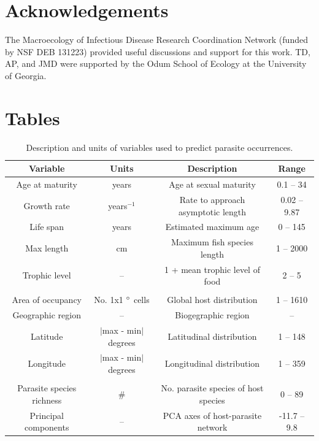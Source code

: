 \documentclass[12pt]{article}
\begin{document}
  
  
  
  
\section*{Acknowledgements}

The Macroecology of Infectious Disease Research Coordination Network (funded by NSF DEB 131223) provided useful discussions and support for this work. TD, AP, and JMD were supported by the Odum School of Ecology at the University of Georgia.






\newpage
\section*{Tables}
  \begin{table}[!h]
  \caption{Description and units of variables used to predict parasite occurrences.}
  \vspace{0.2cm}
  \begin{tabular}{cccc}
\hline
{Variable} &   {Units} &   {Description} &   {Range} \\ 
\hline
Age at maturity & years        & Age at sexual maturity  & 0.1 -- 34  \\ 
Growth rate     & years$^{-1}$ & Rate to approach asymptotic length & 0.02 -- 9.87 \\ 
Life span       & years        & Estimated maximum age & 0 -- 145  \\ 
Max length      & cm           & Maximum fish species length  & 1 -- 2000 \\ 
Trophic level   & --           & 1 + mean trophic level of food  &  2 -- 5\\ 
 & & &  \\
Area of occupancy   & No. 1x1 $\degree$ cells &  Global host distribution  & 1 -- 1610    \\
Geographic region   & --       &   Biogegraphic region        & -- \\ 
Latitude            & $\lvert$max - min$\rvert$ degrees & Latitudinal distribution         & 1 -- 148 \\ 
Longitude           & $\lvert$max - min$\rvert$ degrees & Longitudinal distribution        & 1 -- 359 \\ 
 & & &  \\
Parasite species richness & \# & No. parasite species of host species &  0 -- 89 \\
Principal components     &  -- & PCA axes of host-parasite network   & -11.7 -- 9.8 \\
\hline
  \end{tabular}
  \label{tab:traits}
\end{table}
\end{document}
